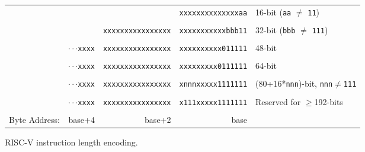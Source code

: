 \begin{figure}[hb]
{
\begin{center}
\begin{tabular}{ccccl}
\cline{4-4}
& & & \multicolumn{1}{|c|}{\tt xxxxxxxxxxxxxxaa} & 16-bit ({\tt aa}
$\neq$ {\tt 11})\\
\cline{4-4}
\\
\cline{3-4}
& & \multicolumn{1}{|c|}{\tt xxxxxxxxxxxxxxxx}
& \multicolumn{1}{c|}{\tt xxxxxxxxxxxbbb11} & 32-bit ({\tt bbb}
$\neq$ {\tt 111}) \\
\cline{3-4}
\\
\cline{2-4}
\hspace{0.1in} 
& \multicolumn{1}{c|}{$\cdot\cdot\cdot${\tt xxxx} }
& \multicolumn{1}{c|}{\tt xxxxxxxxxxxxxxxx}
& \multicolumn{1}{c|}{\tt xxxxxxxxxx011111} & 48-bit \\
\cline{2-4}
\\
\cline{2-4}
\hspace{0.1in} 
& \multicolumn{1}{c|}{$\cdot\cdot\cdot${\tt xxxx} }
& \multicolumn{1}{c|}{\tt xxxxxxxxxxxxxxxx}
& \multicolumn{1}{c|}{\tt xxxxxxxxx0111111} & 64-bit \\
\cline{2-4}
\\
\cline{2-4}
\hspace{0.1in} 
& \multicolumn{1}{c|}{$\cdot\cdot\cdot${\tt xxxx} }
& \multicolumn{1}{c|}{\tt xxxxxxxxxxxxxxxx}
& \multicolumn{1}{c|}{\tt xnnnxxxxx1111111} & (80+16*{\tt nnn})-bit,
       {\tt nnn}$\neq${\tt 111} \\
\cline{2-4}
\\
\cline{2-4}
\hspace{0.1in} 
& \multicolumn{1}{c|}{$\cdot\cdot\cdot${\tt xxxx} }
& \multicolumn{1}{c|}{\tt xxxxxxxxxxxxxxxx}
& \multicolumn{1}{c|}{\tt x111xxxxx1111111} & Reserved for $\geq$192-bits \\
\cline{2-4}
\\
Byte Address: & \multicolumn{1}{r}{base+4} & \multicolumn{1}{r}{base+2} & \multicolumn{1}{r}{base} & \\
 \end{tabular}
\end{center}
}
\caption{RISC-V instruction length encoding.}
\label{instlengthcode}
\end{figure}

